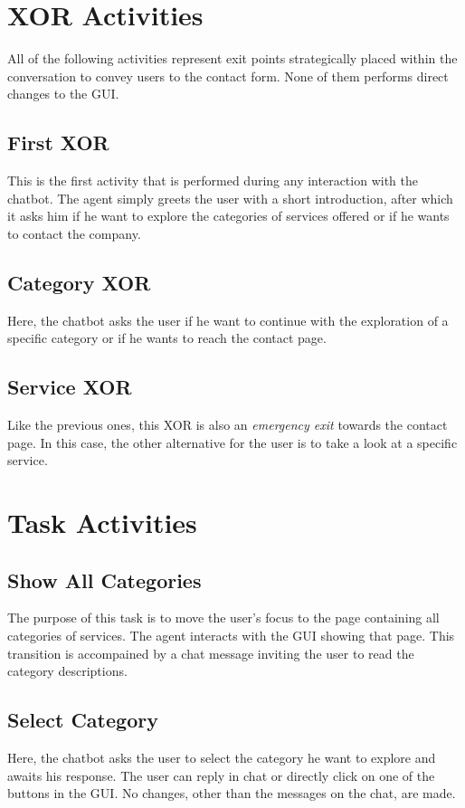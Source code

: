 \documentclass[12pt]{report}
\begin{document}
\section{XOR Activities}
All of the following activities represent exit points strategically placed
within the conversation to convey users to the contact form.
None of them performs direct changes to the GUI.

\subsection{First XOR}
This is the first activity that is performed during any interaction with
the chatbot. The agent simply greets the user with a short introduction,
after which it asks him if he want to explore the categories of services
offered or if he wants to contact the company.

\subsection{Category XOR}
Here, the chatbot asks the user if he want to continue with the exploration 
of a specific category or if he wants to reach the contact page.

\subsection{Service XOR}
Like the previous ones, this XOR is also an \emph{emergency exit} towards 
the contact page. In this case, the other alternative for the user is to 
take a look at a specific service.

\section{Task Activities}

\subsection{Show All Categories}
The purpose of this task is to move the user's focus to the page containing 
all categories of services. 
The agent interacts with the GUI showing that page. 
This transition is accompained by a chat message inviting the user to read 
the category descriptions.

\subsection{Select Category}
Here, the chatbot asks the user to select the category he want to explore 
and awaits his response.
The user can reply in chat or directly click on one of the buttons in the GUI.
No changes, other than the messages on the chat, are made.
\end{document}
